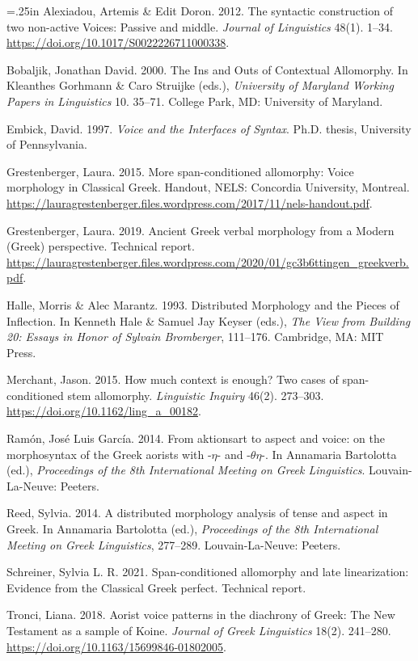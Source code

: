 \documentclass[]{ling-200b-2}
\makeatletter
\newcommand{\hangpara}[2]{\hangindent#1\hangafter#2\noindent}
\newenvironment{hangparas}[2]{\setlength{\parindent}{\z@}%
  \everypar={\hangpara{#1}{#2}}}{\par}
\makeatother
\begin{document}
\begin{hangparas}{.25in}{1}
\small
Alexiadou, Artemis \& Edit Doron. 2012. The syntactic construction of two non-active Voices: Passive and middle. \textit{Journal of Linguistics} 48(1). 1--34. \url{https://doi.org/10.1017/S0022226711000338}.

Bobaljik, Jonathan David. 2000. The Ins and Outs of Contextual Allomorphy. In Kleanthes Gorhmann \& Caro Struijke (eds.), \textit{University of Maryland Working Papers in Linguistics} 10. 35--71. College Park, MD: University of Maryland.

Embick, David. 1997. \textit{Voice and the Interfaces of Syntax}. Ph.D. thesis, University of Pennsylvania.

Grestenberger, Laura. 2015. More span-conditioned allomorphy: Voice morphology in Classical Greek. Handout, NELS: Concordia University, Montreal. \url{https://lauragrestenberger.files.wordpress.com/2017/11/nels-handout.pdf}.

Grestenberger, Laura. 2019. Ancient Greek verbal morphology from a Modern (Greek) perspective. Technical report. \url{https://lauragrestenberger.files.wordpress.com/2020/01/gc3b6ttingen_greekverb.pdf}.

Halle, Morris \& Alec Marantz. 1993. Distributed Morphology and the Pieces of Inflection. In Kenneth Hale \& Samuel Jay Keyser (eds.), \textit{The View from Building 20: Essays in Honor of Sylvain Bromberger}, 111--176. Cambridge, MA: MIT Press.

Merchant, Jason. 2015. How much context is enough? Two cases of span-conditioned stem allomorphy. \textit{Linguistic Inquiry} 46(2). 273--303. \url{https://doi.org/10.1162/ling_a_00182}.

Ram{\'o}n, Jos{\'e} Luis Garc{\'i}a. 2014. From aktionsart to aspect and voice: on the morphosyntax of the Greek aorists with -$\eta$- and -$\theta\eta$-. In Annamaria Bartolotta (ed.), \textit{Proceedings of the 8th International Meeting on Greek Linguistics}. Louvain-La-Neuve: Peeters.

Reed, Sylvia. 2014. A distributed morphology analysis of tense and aspect in Greek. In Annamaria Bartolotta (ed.), \textit{Proceedings of the 8th International Meeting on Greek Linguistics}, 277--289. Louvain-La-Neuve: Peeters.

Schreiner, Sylvia L. R. 2021. Span-conditioned allomorphy and late linearization: Evidence from the Classical Greek perfect. Technical report.

Tronci, Liana. 2018. Aorist voice patterns in the diachrony of Greek: The New Testament as a sample of Koine. \textit{Journal of Greek Linguistics} 18(2). 241--280. \url{https://doi.org/10.1163/15699846-01802005}.
\end{hangparas}
\end{document}
